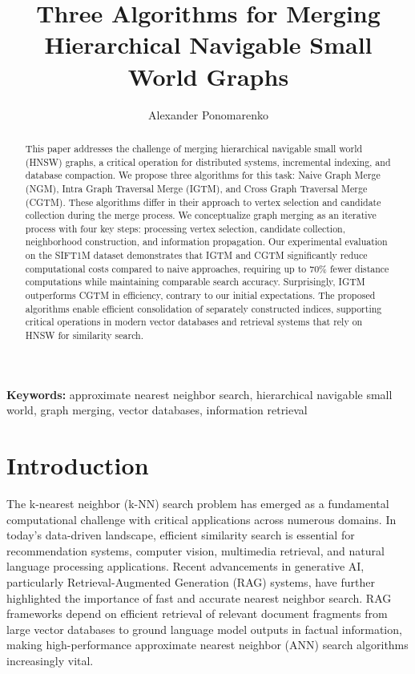 \documentclass{article}
\title{Three Algorithms for Merging Hierarchical Navigable Small World Graphs}
\author[1,2]{Alexander Ponomarenko}
\date{}
\affil[1]{Laboratory LATNA, HSE University}
\affil[2]{Yugabyte, Inc}
\begin{document}
\maketitle

\begin{abstract}
This paper addresses the challenge of merging hierarchical navigable small world (HNSW) graphs, a critical operation for distributed systems, incremental indexing, and database compaction. We propose three algorithms for this task: Naive Graph Merge (NGM), Intra Graph Traversal Merge (IGTM), and Cross Graph Traversal Merge (CGTM). These algorithms differ in their approach to vertex selection and candidate collection during the merge process. We conceptualize graph merging as an iterative process with four key steps: processing vertex selection, candidate collection, neighborhood construction, and information propagation. Our experimental evaluation on the SIFT1M dataset demonstrates that IGTM and CGTM significantly reduce computational costs compared to naive approaches, requiring up to 70\% fewer distance computations while maintaining comparable search accuracy. Surprisingly, IGTM outperforms CGTM in efficiency, contrary to our initial expectations. The proposed algorithms enable efficient consolidation of separately constructed indices, supporting critical operations in modern vector databases and retrieval systems that rely on HNSW for similarity search.
\end{abstract}

\textbf{Keywords:} approximate nearest neighbor search, hierarchical navigable small world, graph merging, vector databases, information retrieval

\section{Introduction}
\label{sec:intro}
The k-nearest neighbor (k-NN) search problem has emerged as a fundamental computational challenge with critical applications across numerous domains. In today's data-driven landscape, efficient similarity search is essential for recommendation systems, computer vision, multimedia retrieval, and natural language processing applications. Recent advancements in generative AI, particularly Retrieval-Augmented Generation (RAG) systems, have further highlighted the importance of fast and accurate nearest neighbor search. RAG frameworks depend on efficient retrieval of relevant document fragments from large vector databases to ground language model outputs in factual information, making high-performance approximate nearest neighbor (ANN) search algorithms increasingly vital.
\end{document}
